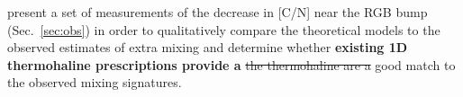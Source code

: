 present a set of measurements of the decrease in [C/N] near the RGB bump (Sec.~\ref{sec:obs}) in order to qualitatively compare the theoretical models to the observed estimates of extra mixing and determine whether 
\textbf{existing 1D thermohaline prescriptions provide a}
\sout{the thermohaline %
are a} 
good match to the observed mixing signatures. 